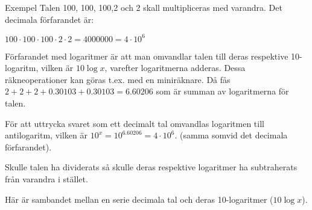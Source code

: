Exempel
Talen 100, 100, 100,2 och 2 skall multipliceras med varandra.
Det decimala förfarandet är:

\(100 \cdot 100 \cdot 100 \cdot 2 \cdot 2 = 4000000 = 4 \cdot 10^6\)

Förfarandet med logaritmer är att man omvandlar talen till deras respektive
10-logaritm, vilken är \(10\log x\), varefter logaritmerna adderas. Dessa
räkneoperationer kan göras t.ex. med en miniräknare. Då fås
\(2 + 2 + 2 + 0.30103 + 0.30103 = 6.60206\) som är summan av logaritmerna för
talen.

För att uttrycka svaret som ett decimalt tal omvandlas logaritmen till
antilogaritm, vilken är \(10^x = 10^{6.60206} = 4 \cdot 10^6\).
(samma somvid det decimala förfarandet).

Skulle talen ha dividerats så skulle deras respektive logaritmer ha subtraherats
från varandra i stället.

Här är sambandet mellan en serie decimala tal och deras 10-logaritmer (\(10\log x\)).

